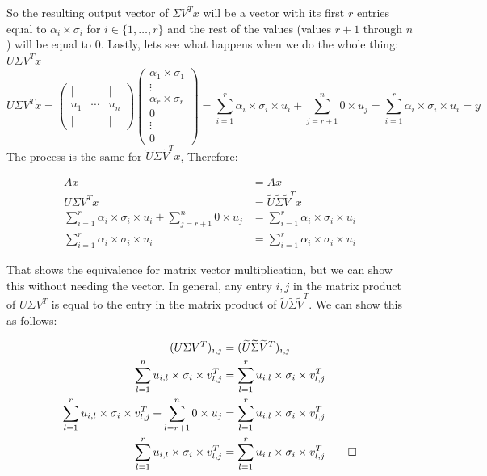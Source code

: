 \documentclass[12pt,twoside]{article}
\begin{document}
So the resulting output vector of $\Sigma V^T x$ will be a vector with its first $r$ entries equal to $\alpha_i\times \sigma_i$ for $i \in \{1,\dots, r\}$ and the rest of the values (values $r+1$ through $n$) will be equal to 0.
Lastly, lets see what happens when we do the whole thing: $U\Sigma V^T x$
$$
U\Sigma V^T x = 
    \begin{pmatrix}
					| & & | \\
					u_1 & \!\cdots\! & u_n \\
					| & & | 
			\end{pmatrix}\begin{pmatrix}
			\alpha_1 \times \sigma_1 \\
			\vdots \\
			\alpha_r \times \sigma_r \\
			0 \\
			\vdots \\
			0
			\end{pmatrix} = \sum_{i=1}^r \alpha_i \times \sigma_i \times u_i + \sum_{j=r+1}^n 0 \times u_j = \sum_{i=1}^r \alpha_i \times \sigma_i \times u_i = y
$$
The process is the same for $\widetilde{U}\widetilde{\Sigma}\widetilde{V}^Tx$, 
Therefore:

\begin{equation}
    \begin{split}
        Ax &= Ax \\
        U\Sigma V^Tx &= \widetilde{U}\widetilde{\Sigma}\widetilde{V}^Tx\\
        \sum_{i=1}^r \alpha_i \times \sigma_i \times u_i + \sum_{j=r+1}^n 0 \times u_j &= \sum_{i=1}^r \alpha_i \times \sigma_i \times u_i\\
        \sum_{i=1}^r \alpha_i \times \sigma_i \times u_i &= \sum_{i=1}^r \alpha_i \times \sigma_i \times u_i
    \end{split}
\end{equation}

That shows the equivalence for matrix vector multiplication, but we can show this without needing the vector. In general, any entry $i,j$ in the matrix product of $U\Sigma V^T$ is equal to the entry in the matrix product of  $\widetilde{U}\widetilde{\Sigma}\widetilde{V}^T$. We can show this as follows: 

\begin{equation}
    \begin{split}
        (U\Sigma V^T)_{i,j}  &= (\widetilde{U}\widetilde{\Sigma}\widetilde{V}^T)_{i,j} \\
        \sum_{l=1}^n  u_{i,l} \times \sigma_{i} \times v_{l,j}^T  &=  \sum_{l=1}^r  u_{i,l} \times \sigma_{i} \times v_{l,j}^T \\
        \sum_{l=1}^r  u_{i,l} \times \sigma_{i} \times v_{l,j}^T + \sum_{l=r+1}^n 0 \times u_j &=  \sum_{l=1}^r  u_{i,l} \times \sigma_{i} \times v_{l,j}^T \\
        \sum_{l=1}^r  u_{i,l} \times \sigma_{i} \times v_{l,j}^T &= \sum_{l=1}^r  u_{i,l} \times \sigma_{i} \times v_{l,j}^T \qed
    \end{split}
\end{equation}
\end{document}

